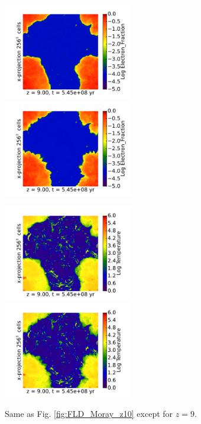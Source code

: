 \begin{figure}[t]
\centerline{\hfill
  \includegraphics[width=0.5\textwidth]{proj_Electron_Fraction_wDensity_x_RD0002.pdf}
  \includegraphics[width=0.5\textwidth]{proj_Electron_Fraction_wDensity_x_RedshiftOutput0004.pdf}
  \hfill}
\centerline{\hfill
  \includegraphics[width=0.5\textwidth]{proj_Temperature_wDensity_x_RD0002.pdf}
  \includegraphics[width=0.5\textwidth]{proj_Temperature_wDensity_x_RedshiftOutput0004.pdf}
  \hfill}
  \caption{ Same as Fig. \ref{fig:FLD_Moray_z10} except for $z=9$.}
  \label{fig:FLD_Moray_z9}
\end{figure}

